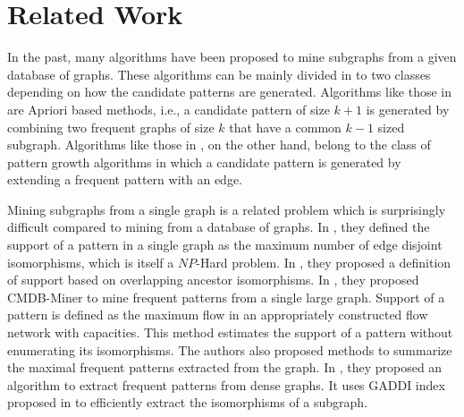 \section{Related Work} 
\label{sec:relatedwork}

In the past, many algorithms have been proposed to mine subgraphs from a
given database of graphs. These algorithms can be mainly divided in to
two classes depending on how the candidate patterns are generated.
Algorithms like those in \cite{IWM03,FSG01,HWP03} are Apriori
based methods, i.e., a candidate pattern of size $k+1$ is generated by
combining two frequent graphs of size $k$ that have a common $k-1$ sized
subgraph.  Algorithms like those in \cite{gSpan,borgelt2002mmf,HWP03},
on the other hand, belong to the class of pattern growth algorithms in
which a candidate pattern is generated by extending a frequent pattern
with an edge. 

Mining subgraphs from a single graph is a related problem which is
surprisingly difficult compared to mining from a database of graphs.  In
\cite{kuramochi2005ffp}, they defined the support of a pattern
in a single graph as the maximum number of edge disjoint isomorphisms,
which is itself a $NP$-Hard problem.  In \cite{fiedler2007support}, they
proposed a definition of support based on overlapping ancestor
isomorphisms.  In \cite{2012-kais}, they proposed
CMDB-Miner\xspace to mine frequent patterns from a single large graph.
Support of a pattern is defined as the maximum flow in an appropriately
constructed flow network with capacities. This method estimates the
support of a pattern without enumerating its isomorphisms. The authors
also proposed methods to summarize the maximal frequent patterns
extracted from the graph. In \cite{li2010dessin}, they proposed an
algorithm to extract frequent patterns from dense graphs. It uses
GADDI index proposed in \cite{Gaddi2009} to efficiently extract the
isomorphisms of a subgraph. 

